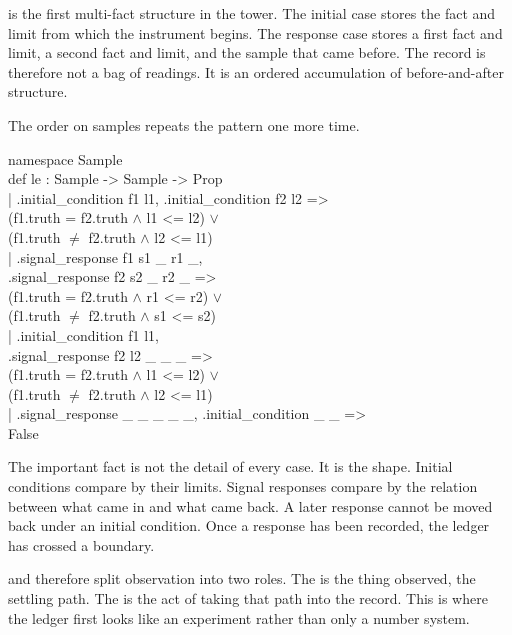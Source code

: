  is the first multi-fact structure in the tower. The initial case
stores the fact and limit from which the instrument begins. The response case
stores a first fact and limit, a second fact and limit, and the sample that
came before. The record is therefore not a bag of readings. It is an ordered
accumulation of before-and-after structure.

The order on samples repeats the pattern one more time.

\begin{leancode}
namespace Sample\\
def le : Sample -> Sample -> Prop\\
\quad | .initial\_condition f1 l1, .initial\_condition f2 l2 =>\\
\quad\quad (f1.truth = f2.truth \(\wedge\) l1 <= l2) \(\vee\)\\
\quad\quad (f1.truth \(\neq\) f2.truth \(\wedge\) l2 <= l1)\\
\quad | .signal\_response f1 s1 \_ r1 \_,\\
\quad\quad .signal\_response f2 s2 \_ r2 \_ =>\\
\quad\quad (f1.truth = f2.truth \(\wedge\) r1 <= r2) \(\vee\)\\
\quad\quad (f1.truth \(\neq\) f2.truth \(\wedge\) s1 <= s2)\\
\quad | .initial\_condition f1 l1,\\
\quad\quad .signal\_response f2 l2 \_ \_ \_ =>\\
\quad\quad (f1.truth = f2.truth \(\wedge\) l1 <= l2) \(\vee\)\\
\quad\quad (f1.truth \(\neq\) f2.truth \(\wedge\) l2 <= l1)\\
\quad | .signal\_response \_ \_ \_ \_ \_, .initial\_condition \_ \_ =>\\
\quad\quad False
\end{leancode}

The important fact is not the detail of every case. It is the shape. Initial
conditions compare by their limits. Signal responses compare by the relation
between what came in and what came back. A later response cannot be moved back
under an initial condition. Once a response has been recorded, the ledger has
crossed a boundary.

 and  therefore split observation into two roles. The
 is the thing observed, the settling path. The  is the
act of taking that path into the record. This is where the ledger first looks
like an experiment rather than only a number system.


